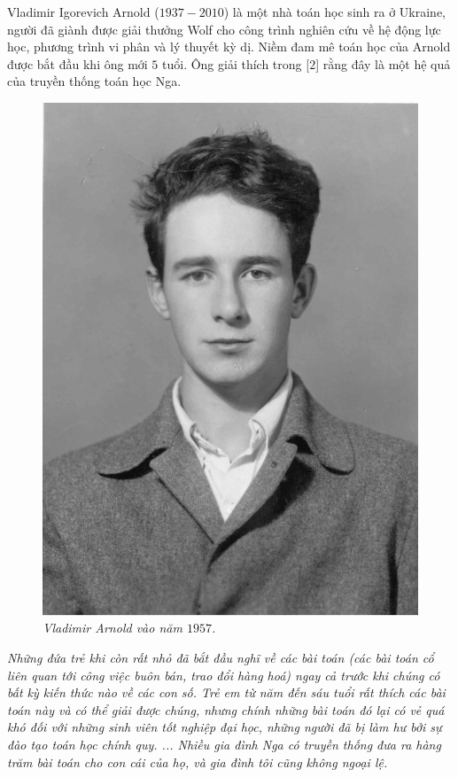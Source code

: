 \begin{multicols}{2}	
	Vladimir Igorevich Arnold ($1937-2010$) là một nhà toán học sinh ra ở Ukraine, người đã giành được giải thưởng Wolf cho công trình nghiên cứu về hệ động lực học, phương trình vi phân và lý thuyết kỳ dị. Niềm đam mê toán học của Arnold được bắt đầu khi ông mới $5$ tuổi. Ông giải thích trong [$2$] rằng đây là một hệ quả của truyền thống toán học Nga.
	\begin{figure}[H]
		\vspace*{-5pt}
		\centering
		\captionsetup{labelformat= empty, justification=centering}
		\includegraphics[width= 0.75\linewidth]{1}
		\caption{\small\textit{\color{quantoan}Vladimir Arnold vào năm $1957$.}}
		\vspace*{-10pt}
	\end{figure}
	\textit{Những  đứa trẻ khi còn rất nhỏ đã bắt đầu nghĩ về các bài toán (các bài toán cổ liên quan tới công việc buôn bán, trao đổi hàng hoá) ngay cả trước khi chúng có bất kỳ kiến thức nào về các con số. Trẻ em từ năm đến sáu tuổi rất thích các bài toán này và có thể giải được chúng, nhưng chính những bài toán đó lại có vẻ quá khó đối với những sinh viên tốt nghiệp đại học, những người đã bị làm hư bởi sự đào tạo toán học chính quy. ... Nhiều gia đình Nga có truyền thống đưa ra hàng trăm bài toán cho con cái của họ, và gia đình tôi cũng không ngoại lệ.}

\end{multicols}
